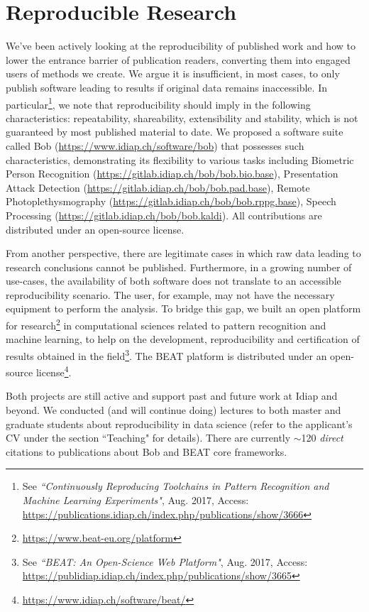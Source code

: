 \documentclass[a4paper,10pt,onecolumn]{article}
\begin{document}
\section{Reproducible Research}

We've been actively looking at the reproducibility of published work and how to
lower the entrance barrier of publication readers, converting them into engaged
users of methods we create.  We argue it is insufficient, in most cases, to
only publish software leading to results if original data remains inaccessible.
In particular\footnote{See \textit{``Continuously Reproducing Toolchains in
Pattern Recognition and Machine Learning Experiments"}, Aug. 2017, Access:
\url{https://publications.idiap.ch/index.php/publications/show/3666}}, we note
that reproducibility should imply in the following characteristics:
repeatability, shareability, extensibility and stability, which is not
guaranteed by most published material to date.  We proposed a software suite
called Bob (\url{https://www.idiap.ch/software/bob}) that possesses such
characteristics, demonstrating its flexibility to various tasks including
Biometric Person Recognition (\url{https://gitlab.idiap.ch/bob/bob.bio.base}),
Presentation Attack Detection (\url{https://gitlab.idiap.ch/bob/bob.pad.base}),
Remote Photoplethysmography (\url{https://gitlab.idiap.ch/bob/bob.rppg.base}),
Speech Processing (\url{https://gitlab.idiap.ch/bob/bob.kaldi}).  All
contributions are distributed under an open-source license.

From another perspective, there are legitimate cases in which raw data leading
to research conclusions cannot be published.  Furthermore, in a growing number
of use-cases, the availability of both software does not translate to an
accessible reproducibility scenario.  The user, for example, may not have the
necessary equipment to perform the analysis.  To bridge this gap, we built an
open platform for research\footnote{\url{https://www.beat-eu.org/platform}} in
computational sciences related to pattern recognition and machine learning, to
help on the development, reproducibility and certification of results obtained
in the field\footnote{See \textit{``BEAT: An Open-Science Web Platform"}, Aug.
2017, Access:
\url{https://publidiap.idiap.ch/index.php/publications/show/3665}}.  The BEAT
platform is distributed under an open-source
license\footnote{\url{https://www.idiap.ch/software/beat/}}.

Both projects are still active and support past and future work at Idiap and
beyond.  We conducted (and will continue doing) lectures to both master and
graduate students about reproducibility in data science (refer to the
applicant's CV under the section ``Teaching" for details).  There are currently
$\sim$120 \textit{direct} citations to publications about Bob and BEAT core
frameworks.
\end{document}
